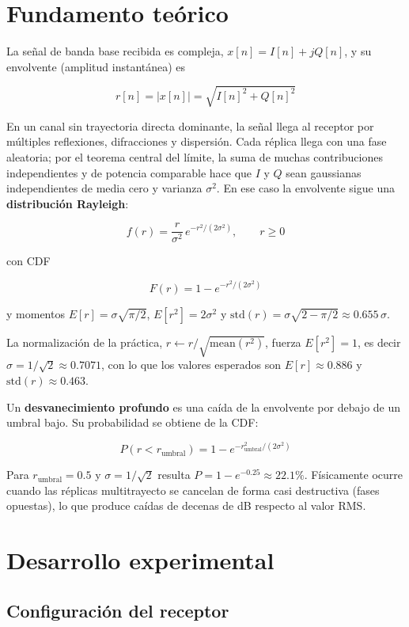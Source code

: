 \documentclass[11pt,a4paper]{article}
\begin{document}
\section{Fundamento teórico}

La señal de banda base recibida es compleja, $x[n] = I[n] + jQ[n]$, y su envolvente (amplitud instantánea) es

\[
r[n] = |x[n]| = \sqrt{I[n]^2 + Q[n]^2}
\]

En un canal sin trayectoria directa dominante, la señal llega al receptor por múltiples reflexiones, difracciones y dispersión. Cada réplica llega con una fase aleatoria; por el teorema central del límite, la suma de muchas contribuciones independientes y de potencia comparable hace que $I$ y $Q$ sean gaussianas independientes de media cero y varianza $\sigma^2$. En ese caso la envolvente sigue una \textbf{distribución Rayleigh}:

\[
f(r) = \frac{r}{\sigma^2}\,e^{-r^2/(2\sigma^2)}, \qquad r \ge 0
\]

con CDF

\[
F(r) = 1 - e^{-r^2/(2\sigma^2)}
\]

y momentos $E[r] = \sigma\sqrt{\pi/2}$, $E[r^2] = 2\sigma^2$ y $\mathrm{std}(r) = \sigma\sqrt{2 - \pi/2}\approx 0.655\,\sigma$.

La normalización de la práctica, $r \leftarrow r/\sqrt{\mathrm{mean}(r^2)}$, fuerza $E[r^2]=1$, es decir $\sigma = 1/\sqrt{2} \approx 0.7071$, con lo que los valores esperados son $E[r] \approx 0.886$ y $\mathrm{std}(r) \approx 0.463$.

Un \textbf{desvanecimiento profundo} es una caída de la envolvente por debajo de un umbral bajo. Su probabilidad se obtiene de la CDF:

\[
P(r < r_{\text{umbral}}) = 1 - e^{-r_{\text{umbral}}^2/(2\sigma^2)}
\]

Para $r_{\text{umbral}} = 0.5$ y $\sigma = 1/\sqrt{2}$ resulta $P = 1 - e^{-0.25} \approx 22.1\%$. Físicamente ocurre cuando las réplicas multitrayecto se cancelan de forma casi destructiva (fases opuestas), lo que produce caídas de decenas de dB respecto al valor RMS.

\section{Desarrollo experimental}

\subsection{Configuración del receptor}
\end{document}
